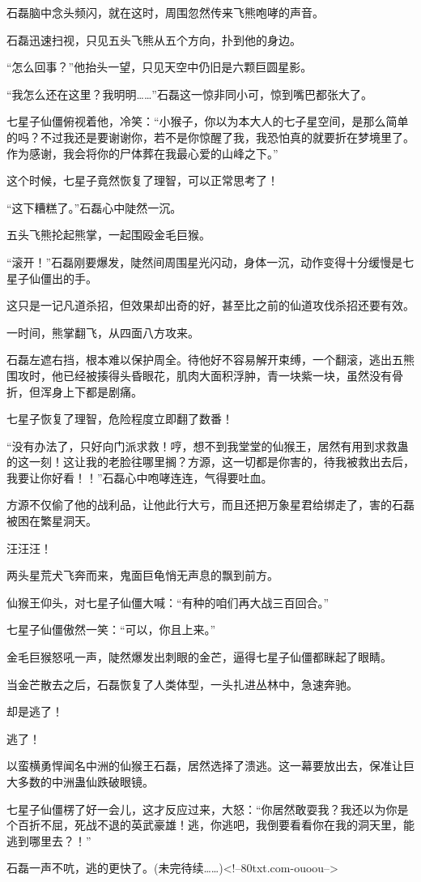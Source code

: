 \begin{this_body}
石磊脑中念头频闪，就在这时，周围忽然传来飞熊咆哮的声音。

石磊迅速扫视，只见五头飞熊从五个方向，扑到他的身边。

“怎么回事？”他抬头一望，只见天空中仍旧是六颗巨圆星影。

“我怎么还在这里？我明明……”石磊这一惊非同小可，惊到嘴巴都张大了。

七星子仙僵俯视着他，冷笑：“小猴子，你以为本大人的七子星空间，是那么简单的吗？不过我还是要谢谢你，若不是你惊醒了我，我恐怕真的就要折在梦境里了。作为感谢，我会将你的尸体葬在我最心爱的山峰之下。”

这个时候，七星子竟然恢复了理智，可以正常思考了！

“这下糟糕了。”石磊心中陡然一沉。

五头飞熊抡起熊掌，一起围殴金毛巨猴。

“滚开！”石磊刚要爆发，陡然间周围星光闪动，身体一沉，动作变得十分缓慢是七星子仙僵出的手。

这只是一记凡道杀招，但效果却出奇的好，甚至比之前的仙道攻伐杀招还要有效。

一时间，熊掌翻飞，从四面八方攻来。

石磊左遮右挡，根本难以保护周全。待他好不容易解开束缚，一个翻滚，逃出五熊围攻时，他已经被揍得头昏眼花，肌肉大面积浮肿，青一块紫一块，虽然没有骨折，但浑身上下都是剧痛。

七星子恢复了理智，危险程度立即翻了数番！

“没有办法了，只好向门派求救！哼，想不到我堂堂的仙猴王，居然有用到求救蛊的这一刻！这让我的老脸往哪里搁？方源，这一切都是你害的，待我被救出去后，我要让你好看！！”石磊心中咆哮连连，气得要吐血。

方源不仅偷了他的战利品，让他此行大亏，而且还把万象星君给绑走了，害的石磊被困在繁星洞天。

汪汪汪！

两头星荒犬飞奔而来，鬼面巨龟悄无声息的飘到前方。

仙猴王仰头，对七星子仙僵大喊：“有种的咱们再大战三百回合。”

七星子仙僵傲然一笑：“可以，你且上来。”

金毛巨猴怒吼一声，陡然爆发出刺眼的金芒，逼得七星子仙僵都眯起了眼睛。

当金芒散去之后，石磊恢复了人类体型，一头扎进丛林中，急速奔驰。

却是逃了！

逃了！

以蛮横勇悍闻名中洲的仙猴王石磊，居然选择了溃逃。这一幕要放出去，保准让巨大多数的中洲蛊仙跌破眼镜。

七星子仙僵楞了好一会儿，这才反应过来，大怒：“你居然敢耍我？我还以为你是个百折不屈，死战不退的英武豪雄！逃，你逃吧，我倒要看看你在我的洞天里，能逃到哪里去？！”

石磊一声不吭，逃的更快了。(未完待续……)<!--80txt.com-ouoou-->

\end{this_body}

